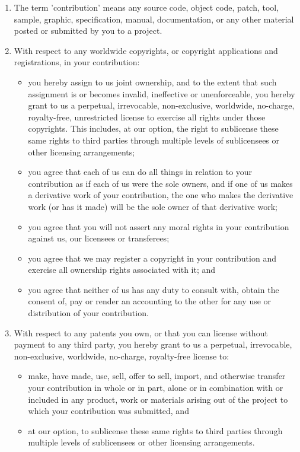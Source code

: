 \documentclass[12pt, a4paper]{article}
\begin{document}
\begin{enumerate}[leftmargin=15pt]

\item The term 'contribution' means any source code, object code,
  patch, tool, sample, graphic, specification, manual, documentation,
  or any other material posted or submitted by you to a project.

\item With respect to any worldwide copyrights, or copyright
  applications and registrations, in your contribution:
  \begin{itemize}[leftmargin=15pt]
  \item you hereby assign to us joint ownership, and to the extent
    that such assignment is or becomes invalid, ineffective or
    unenforceable, you hereby grant to us a perpetual, irrevocable,
    non-exclusive, worldwide, no-charge, royalty-free, unrestricted
    license to exercise all rights under those copyrights. This
    includes, at our option, the right to sublicense these same rights
    to third parties through multiple levels of sublicensees or other
    licensing arrangements;
  \item you agree that each of us can do all things in relation to
    your contribution as if each of us were the sole owners, and if
    one of us makes a derivative work of your contribution, the one
    who makes the derivative work (or has it made) will be the sole
    owner of that derivative work;
  \item you agree that you will not assert any moral rights in your
    contribution against us, our licensees or transferees;
  \item you agree that we may register a copyright in your
    contribution and exercise all ownership rights associated with it;
    and
  \item you agree that neither of us has any duty to consult with,
    obtain the consent of, pay or render an accounting to the other
    for any use or distribution of your contribution.
  \end{itemize}

\item With respect to any patents you own, or that you can license
  without payment to any third party, you hereby grant to us a
  perpetual, irrevocable, non-exclusive, worldwide, no-charge,
  royalty-free license to:

  \begin{itemize}[leftmargin=15pt]
  \item make, have made, use, sell, offer to sell, import, and
    otherwise transfer your contribution in whole or in part, alone or
    in combination with or included in any product, work or materials
    arising out of the project to which your contribution was
    submitted, and
  \item at our option, to sublicense these same rights to third
    parties through multiple levels of sublicensees or other licensing
    arrangements.
  \end{itemize}


\end{enumerate}
\end{document}
